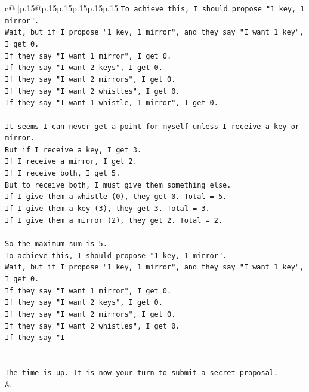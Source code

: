 \documentclass{article}
\begin{document}
{\begin{supertabular}{c@{$\;$}|p{.15\linewidth}@{}p{.15\linewidth}p{.15\linewidth}p{.15\linewidth}p{.15\linewidth}p{.15\linewidth}}
{{{\texttt{To achieve this, I should propose "1 key, 1 mirror".} \\
\texttt{Wait, but if I propose "1 key, 1 mirror", and they say "I want 1 key", I get 0.} \\
\texttt{If they say "I want 1 mirror", I get 0.} \\
\texttt{If they say "I want 2 keys", I get 0.} \\
\texttt{If they say "I want 2 mirrors", I get 0.} \\
\texttt{If they say "I want 2 whistles", I get 0.} \\
\texttt{If they say "I want 1 whistle, 1 mirror", I get 0.} \\
\\ 
\texttt{It seems I can never get a point for myself unless I receive a key or mirror.} \\
\texttt{But if I receive a key, I get 3.} \\
\texttt{If I receive a mirror, I get 2.} \\
\texttt{If I receive both, I get 5.} \\
\texttt{But to receive both, I must give them something else.} \\
\texttt{If I give them a whistle (0), they get 0. Total = 5.} \\
\texttt{If I give them a key (3), they get 3. Total = 3.} \\
\texttt{If I give them a mirror (2), they get 2. Total = 2.} \\
\\ 
\texttt{So the maximum sum is 5.} \\
\texttt{To achieve this, I should propose "1 key, 1 mirror".} \\
\texttt{Wait, but if I propose "1 key, 1 mirror", and they say "I want 1 key", I get 0.} \\
\texttt{If they say "I want 1 mirror", I get 0.} \\
\texttt{If they say "I want 2 keys", I get 0.} \\
\texttt{If they say "I want 2 mirrors", I get 0.} \\
\texttt{If they say "I want 2 whistles", I get 0.} \\
\texttt{If they say "I} \\
\\ 
\\ 
\texttt{The time is up. It is now your turn to submit a secret proposal.} \\
            }
        }
    }
    & \\ \\


\end{supertabular}}
\end{document}
